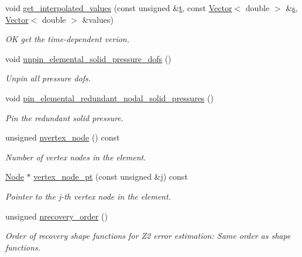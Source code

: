 \begin{DoxyCompactItemize}
void \hyperlink{classoomph_1_1RefineableQPVDElementWithContinuousPressure_afed4014b4823a87360efcf723d52b5f5}{get\+\_\+interpolated\+\_\+values} (const unsigned \&\hyperlink{cfortran_8h_af6f0bd3dc13317f895c91323c25c2b8f}{t}, const \hyperlink{classoomph_1_1Vector}{Vector}$<$ double $>$ \&\hyperlink{cfortran_8h_ab7123126e4885ef647dd9c6e3807a21c}{s}, \hyperlink{classoomph_1_1Vector}{Vector}$<$ double $>$ \&values)
\begin{DoxyCompactList}\small\item\em OK get the time-\/dependent verion. \end{DoxyCompactList}\item 
void \hyperlink{classoomph_1_1RefineableQPVDElementWithContinuousPressure_a7dd0d23afdb19626b2eb1ddfa0dc9612}{unpin\+\_\+elemental\+\_\+solid\+\_\+pressure\+\_\+dofs} ()
\begin{DoxyCompactList}\small\item\em Unpin all pressure dofs. \end{DoxyCompactList}\item 
void \hyperlink{classoomph_1_1RefineableQPVDElementWithContinuousPressure_a5f2c7682c947acf7ce7689a30d31f48a}{pin\+\_\+elemental\+\_\+redundant\+\_\+nodal\+\_\+solid\+\_\+pressures} ()
\begin{DoxyCompactList}\small\item\em Pin the redundant solid pressure. \end{DoxyCompactList}\item 
unsigned \hyperlink{classoomph_1_1RefineableQPVDElementWithContinuousPressure_a4cf706224993a10a0c774a314d4c25c4}{nvertex\+\_\+node} () const
\begin{DoxyCompactList}\small\item\em Number of vertex nodes in the element. \end{DoxyCompactList}\item 
\hyperlink{classoomph_1_1Node}{Node} $\ast$ \hyperlink{classoomph_1_1RefineableQPVDElementWithContinuousPressure_a9afc4605536e3f3a637ae1694c0d9065}{vertex\+\_\+node\+\_\+pt} (const unsigned \&j) const
\begin{DoxyCompactList}\small\item\em Pointer to the j-\/th vertex node in the element. \end{DoxyCompactList}\item 
unsigned \hyperlink{classoomph_1_1RefineableQPVDElementWithContinuousPressure_aa0689547ae0239df24c07a985e891a16}{nrecovery\+\_\+order} ()
\begin{DoxyCompactList}\small\item\em Order of recovery shape functions for Z2 error estimation\+: Same order as shape functions. \end{DoxyCompactList}\item 

\end{DoxyCompactItemize}
